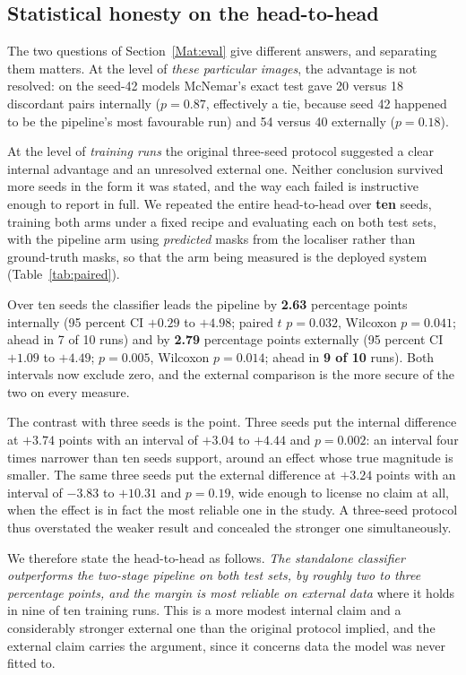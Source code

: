 \documentclass{elektr}
\begin{document}
\subsection{Statistical honesty on the head-to-head}
\label{Res:stat}
The two questions of Section~\ref{Mat:eval} give different answers, and separating them matters. At the level of \emph{these particular images}, the advantage is not resolved: on the seed-42 models McNemar's exact test gave 20 versus 18 discordant pairs internally ($p=0.87$, effectively a tie, because seed 42 happened to be the pipeline's most favourable run) and 54 versus 40 externally ($p=0.18$).

At the level of \emph{training runs} the original three-seed protocol suggested a clear internal advantage and an unresolved external one. Neither conclusion survived more seeds in the form it was stated, and the way each failed is instructive enough to report in full. We repeated the entire head-to-head over \textbf{ten} seeds, training both arms under a fixed recipe and evaluating each on both test sets, with the pipeline arm using \emph{predicted} masks from the localiser rather than ground-truth masks, so that the arm being measured is the deployed system (Table~\ref{tab:paired}).

Over ten seeds the classifier leads the pipeline by \textbf{2.63} percentage points internally (95 percent CI $+0.29$ to $+4.98$; paired $t$ $p=0.032$, Wilcoxon $p=0.041$; ahead in 7 of 10 runs) and by \textbf{2.79} percentage points externally (95 percent CI $+1.09$ to $+4.49$; $p=0.005$, Wilcoxon $p=0.014$; ahead in \textbf{9 of 10} runs). Both intervals now exclude zero, and the external comparison is the more secure of the two on every measure.

The contrast with three seeds is the point. Three seeds put the internal difference at $+3.74$ points with an interval of $+3.04$ to $+4.44$ and $p=0.002$: an interval four times narrower than ten seeds support, around an effect whose true magnitude is smaller. The same three seeds put the external difference at $+3.24$ points with an interval of $-3.83$ to $+10.31$ and $p=0.19$, wide enough to license no claim at all, when the effect is in fact the most reliable one in the study. A three-seed protocol thus overstated the weaker result and concealed the stronger one simultaneously.

We therefore state the head-to-head as follows. \emph{The standalone classifier outperforms the two-stage pipeline on both test sets, by roughly two to three percentage points, and the margin is most reliable on external data} where it holds in nine of ten training runs. This is a more modest internal claim and a considerably stronger external one than the original protocol implied, and the external claim carries the argument, since it concerns data the model was never fitted to.
\end{document}
